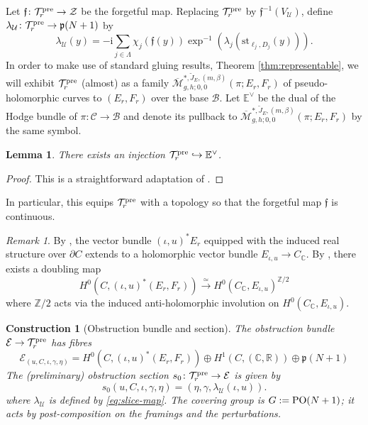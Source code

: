 \documentclass[11pt,psamsfonts, oneside, reqno]{amsart}
\newcommand{\hkra}{\hookrightarrow}
\newcommand{\s}[2]{\sum\limits_{#1}{#2} }
\newcommand{\inv}{^{-1}}
\newcommand{\cl}{\colon}
\newcommand{\xra}{\xrightarrow}
\newcommand{\dul}{^\vee}
\newcommand{\Mbar}{\overline{\mathcal M}}
\newcommand{\del}{\partial}
\newcommand{\bC}{\mathbb{C}}
\newcommand{\bE}{\mathbb{E}}
\newcommand{\bR}{\mathbb{R}}
\newcommand{\bZ}{\mathbb{Z}}
\newcommand{\cB}{\mathcal{B}}
\newcommand{\cC}{\mathcal{C}}
\newcommand{\cE}{\mathcal{E}}
\newcommand{\cT}{\mathcal{T}}
\newcommand{\cU}{\mathcal{U}}
\newcommand{\cZ}{\mathcal{Z}}
\newcommand{\ff}{\mathfrak{f}}
\newcommand{\fp}{\mathfrak{p}}
\newcommand{\wt}{\widetilde}
\newcommand{\hodge}{\bE\dul}
\newcommand{\obs}{s}
\newtheorem{lemma}[theorem]{Lemma}
\newtheorem{construction}[theorem]{Construction}
\theoremstyle{definition}
\theoremstyle{remark}
\newtheorem{remark}[theorem]{Remark}
\numberwithin{equation}{section}
\begin{document}
\noindent
Let $\ff \cl \cT^{\normalfont\text{pre}}_r\to \cZ$ be the forgetful map. Replacing $\cT^{\normalfont\text{pre}}_r$ by $\ff\inv(V_\cU)$, define $\lambda_\cU \cl \cT^{\normalfont\text{pre}}_r\to \fp(N+1)$ by 
\begin{equation}\label{eq:slice-map}
	\lambda_\cU(y) = -\text{i}\s{j\in \Lambda}{\chi_j(\ff(y))\exp\inv(\lambda_j(\text{st}_{\ell_j,D_j}(y)))}. 
\end{equation}
In order to make use of standard gluing results, Theorem \ref{thm:representable}, we will exhibit $\cT^{\normalfont\text{pre}}_r$ (almost) as a family $\Mbar_{g,h;0,0}^{*,\wt J_E,(m,\beta)}(\pi;E_r,F_r)$ of pseudo-holomorphic curves to $(E_r,F_r)$ over the base $\cB$. Let $\hodge$ be the dual of the Hodge bundle of $\pi\cl \cC\to \cB$ and denote its pullback to $\Mbar_{g,h;0,0}^{*,\wt J_E,(m,\beta)}(\pi;E_r,F_r)$ by the same symbol.

\begin{lemma}\label{lem:subspace-of-other-holomorphic-maps} There exists an injection $\cT^{\normalfont\text{pre}}_r\hkra \hodge$. \end{lemma}

\begin{proof}
	This is a straightforward adaptation of \cite[Lemma~4.16]{HS22}.
\end{proof}

\noindent
In particular, this equips $\cT^{\normalfont\text{pre}}_r$ with a topology so that the forgetful map $\ff$ is continuous. 

\begin{remark}\label{rem:doubling-perturbations}  By \cite[Theorem 3.3.8]{KL06}, the vector bundle $(\iota,u)^*E_r$ equipped with the induced real structure over $\del C$ extends to a holomorphic vector bundle $E_{\iota,u}\to C_\bC$. By \cite[Theorem 3.3.3]{KL06}, there exists a doubling map 
	$$H^0(C,(\iota,u)^*(E_r,F_r))\xra{\simeq} H^0(C_\bC,E_{\iota,u})^{\bZ/2}$$ 
	where $\bZ/2$ acts via the induced anti-holomorphic involution on $H^0(C_\bC,E_{\iota,u})$.
\end{remark}


\begin{construction}[Obstruction bundle and section]\label{construction-other-data} The \emph{obstruction bundle} $\cE\to \cT_r^{\normalfont\text{pre}}$ has fibres 
	\begin{equation}\label{eq:obstruction-fibre}
		\cE_{(u,C,\iota,\gamma,\eta)} =   H^0(C,(\iota,u)^*(E_r,F_r)) \oplus H^1(C,(\bC,\bR))\oplus \fp(N+1)
	\end{equation}
	The \emph{(preliminary) obstruction section} $\obs_0 \cl \cT_r^{\normalfont\text{pre}}\to \cE$ is given by 
	$$\obs_0(u,C,\iota,\gamma,\eta) = (\eta,\gamma,\lambda_\cU(\iota,u)).$$
	where $\lambda_\cU$ is defined by \eqref{eq:slice-map}. The \emph{covering group} is $G := \normalfont\text{PO}(N+1)$; it acts by post-composition on the framings and the perturbations.
\end{construction}
\end{document}
